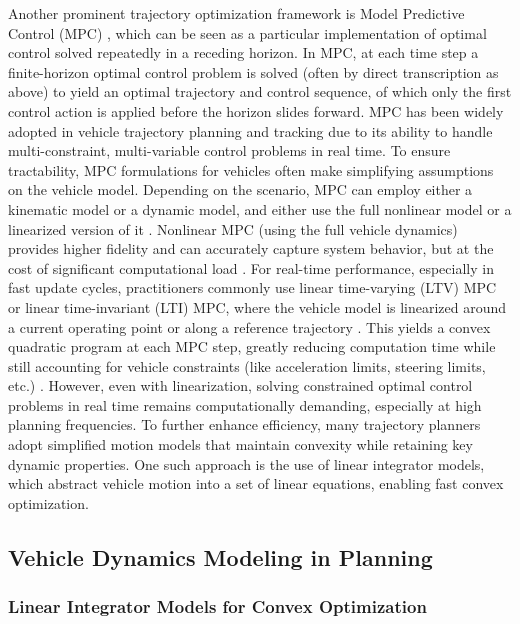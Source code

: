 Another prominent trajectory optimization framework is Model Predictive Control (MPC) \cite{falcone_predictive_2007,gray_robust_2013}, which can be
seen as a particular implementation of optimal control solved repeatedly in a receding horizon.
In MPC, at each time step a finite-horizon optimal control problem is solved (often by direct transcription as above) to yield an optimal trajectory
and control sequence, of which only the first control action is applied before the horizon slides forward.
MPC has been widely adopted in vehicle trajectory planning and tracking due to its ability to handle multi-constraint, multi-variable control
problems in real time.
To ensure tractability, MPC formulations for vehicles often make simplifying assumptions on the vehicle model.
Depending on the scenario, MPC can employ either a kinematic model or a dynamic model, and either use the full nonlinear model or a linearized
version of it \cite{xia_survey_2024}.
Nonlinear MPC (using the full vehicle dynamics) provides higher fidelity and can accurately capture system behavior, but at the cost of significant
computational load \cite{xia_survey_2024}.
For real-time performance, especially in fast update cycles, practitioners commonly use linear time-varying (LTV) MPC or linear time-invariant (LTI)
MPC, where the vehicle model is linearized around a current operating point or along a reference trajectory \cite{xia_survey_2024}.
This yields a convex quadratic program at each MPC step, greatly reducing computation time while still accounting for vehicle constraints (like
acceleration limits, steering limits, etc.)
\cite{xia_survey_2024}.
However, even with linearization, solving constrained optimal control problems in real time remains computationally demanding, especially at high
planning frequencies.
To further enhance efficiency, many trajectory planners adopt simplified motion models that maintain convexity while retaining key dynamic
properties.
One such approach is the use of linear integrator models, which abstract vehicle motion into a set of linear equations, enabling fast convex
optimization.

\subsection{Vehicle Dynamics Modeling in Planning}

\subsubsection{Linear Integrator Models for Convex Optimization}

